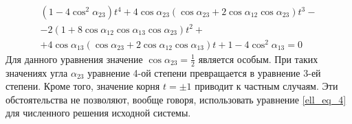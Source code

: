 \documentclass[../main.tex]{subfiles}
\begin{document}
\begin{equation}
\begin {array}{l}
(1-4 \cos^2 \alpha_{23}) t^4 + 4 \cos \alpha_{23} (\cos \alpha_{23} + 2 \cos \alpha_{12} \cos \alpha_{23} ) t^3 - \\
- 2 (1 + 8 \cos \alpha_{12} \cos \alpha_{13} \cos \alpha_{23}) t^2 +
\\+ 4 \cos \alpha_{13} (\cos \alpha_{23} + 2 \cos \alpha_{12} \cos \alpha_{13}) t + 1-4 \cos^2 \alpha_{13} =0
\end {array}
\label{ell_eq_4}
\end{equation}
Для данного уравнения значение $\cos \alpha_{23}= \frac{1}{2}$ является особым. При таких значениях угла $\alpha_{23}$ уравнение 4-ой степени превращается в уравнение 3-ей степени. Кроме того, значение корня $t=\pm 1$ приводит к частным случаям. Эти обстоятельства не позволяют, вообще говоря, использовать уравнение \eqref{ell_eq_4}   для численного решения исходной системы.
\end{document}
